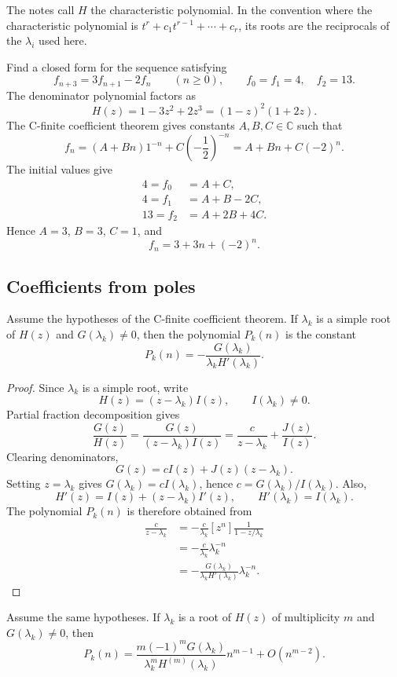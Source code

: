 \begin{remark}
The notes call $H$ the characteristic polynomial. In the convention where the characteristic polynomial is $t^r+c_1t^{r-1}+\cdots+c_r$, its roots are the reciprocals of the $\lambda_i$ used here.
\end{remark}
\begin{example}
Find a closed form for the sequence satisfying
\[
f_{n+3}=3f_{n+1}-2f_n\qquad(n\ge0),
\qquad f_0=f_1=4,\quad f_2=13.
\]
The denominator polynomial factors as
\[
H(z)=1-3z^2+2z^3=(1-z)^2(1+2z).
\]
The C-finite coefficient theorem gives constants $A,B,C\in\mathbb C$ such that
\[
f_n=(A+Bn)1^{-n}+C\left(-\frac12\right)^{-n}
=A+Bn+C(-2)^n.
\]
The initial values give
\begin{align*}
4=f_0&=A+C,\\
4=f_1&=A+B-2C,\\
13=f_2&=A+2B+4C.
\end{align*}
Hence $A=3$, $B=3$, $C=1$, and
\[
f_n=3+3n+(-2)^n.
\]
\end{example}

\subsection{Coefficients from poles}
\begin{lemma}
Assume the hypotheses of the C-finite coefficient theorem. If $\lambda_k$ is a simple root of $H(z)$ and $G(\lambda_k)\ne0$, then the polynomial $P_k(n)$ is the constant
\[
P_k(n)=-\frac{G(\lambda_k)}{\lambda_kH'(\lambda_k)}.
\]
\end{lemma}
\begin{proof}
Since $\lambda_k$ is a simple root, write
\[
H(z)=(z-\lambda_k)I(z),\qquad I(\lambda_k)\ne0.
\]
Partial fraction decomposition gives
\[
\frac{G(z)}{H(z)}=\frac{G(z)}{(z-\lambda_k)I(z)}
=\frac c{z-\lambda_k}+\frac{J(z)}{I(z)}.
\]
Clearing denominators,
\[
G(z)=cI(z)+J(z)(z-\lambda_k).
\]
Setting $z=\lambda_k$ gives $G(\lambda_k)=cI(\lambda_k)$, hence $c=G(\lambda_k)/I(\lambda_k)$.
Also,
\[
H'(z)=I(z)+(z-\lambda_k)I'(z),\qquad H'(\lambda_k)=I(\lambda_k).
\]
The polynomial $P_k(n)$ is therefore obtained from
\begin{align*}
[z^n]\frac c{z-\lambda_k}
&=-\frac c{\lambda_k}[z^n]\frac1{1-z/\lambda_k}\\
&=-\frac c{\lambda_k}\lambda_k^{-n}\\
&=-\frac{G(\lambda_k)}{\lambda_kH'(\lambda_k)}\lambda_k^{-n}.
\end{align*}
\end{proof}
\begin{lemma}
Assume the same hypotheses. If $\lambda_k$ is a root of $H(z)$ of multiplicity $m$ and $G(\lambda_k)\ne0$, then
\[
P_k(n)=\frac{m(-1)^mG(\lambda_k)}{\lambda_k^mH^{(m)}(\lambda_k)}n^{m-1}
+O(n^{m-2}).
\]
\end{lemma}

